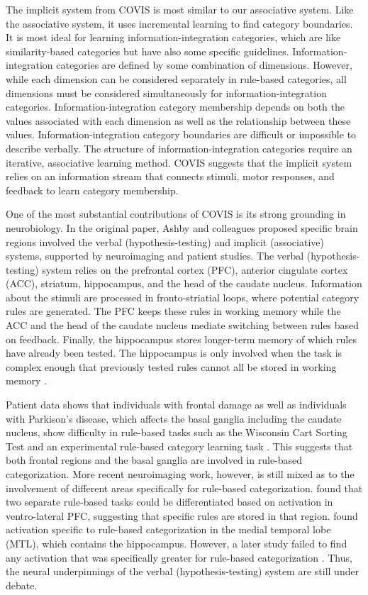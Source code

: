 \documentclass[../dissertation.tex]{subfiles}
\begin{document}
	The implicit system from COVIS is most similar to our associative system. Like the associative system, it uses incremental learning to find category boundaries. It is most ideal for learning information-integration categories, which are like similarity-based categories but have also some specific guidelines. Information-integration categories are defined by some combination of dimensions. However, while each dimension can be considered separately in rule-based categories, all dimensions must be considered simultaneously for information-integration categories. Information-integration category membership depends on both the values associated with each dimension as well as the relationship between these values. Information-integration category boundaries are difficult or impossible to describe verbally. The structure of information-integration categories require an iterative, associative learning method. COVIS suggests that the implicit system relies on an information stream that connects stimuli, motor responses, and feedback to learn category membership. \par
	One of the most substantial contributions of COVIS is its strong grounding in neurobiology. In the original paper, Ashby and colleagues proposed specific brain regions involved the verbal (hypothesis-testing) and implicit (associative) systems, supported by neuroimaging and patient studies. The verbal (hypothesis-testing) system relies on the prefrontal cortex (PFC), anterior cingulate cortex (ACC), striatum, hippocampus, and the head of the caudate nucleus. Information about the stimuli are processed in fronto-striatial loops, where potential category rules are generated. The PFC keeps these rules in working memory while the ACC and the head of the caudate nucleus mediate switching between rules based on feedback. Finally, the hippocampus stores longer-term memory of which rules have already been tested. The hippocampus is only involved when the task is complex enough that previously tested rules cannot all be stored in working memory \citep{Ashby2005,Ashby2011}. \par
	 Patient data shows that individuals with frontal damage as well as individuals with Parkison's disease, which affects the basal ganglia including the caudate nucleus, show difficulty in rule-based tasks such as the Wisconsin Cart Sorting Test \citep{Robinson1980} and an experimental rule-based category learning task \citep{Ashby2003b}. This suggests that both frontal regions and the basal ganglia are involved in rule-based categorization. More recent neuroimaging work, however, is still mixed as to the involvement of different areas specifically for rule-based categorization. \citet{Soto2013} found that two separate rule-based tasks could be differentiated based on activation in ventro-lateral PFC, suggesting that specific rules are stored in that region. \citet{Nomura2007} found activation specific to rule-based categorization in the medial temporal lobe (MTL), which contains the hippocampus. However, a later study failed to find any activation that was specifically greater for rule-based categorization \citep{Carpenter2016}. Thus, the neural underpinnings of the verbal (hypothesis-testing) system are still under debate. \par
\end{document}
